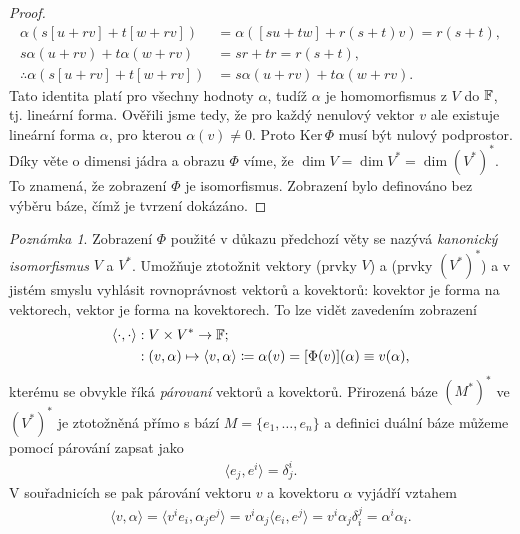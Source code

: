\documentclass[a4paper,11pt]{report}
\theoremstyle{theorem}
\theoremstyle{remark}
\newtheorem*{remark}{Poznámka}
\theoremstyle{definition}
\newcommand{\Ker}{{\mathrm{Ker}\,}}
\begin{document}
\begin{proof}
				\begin{align*}
					\alpha(s[u+rv] + t[w+rv]) &= \alpha([su + tw] + r(s+t)v) = r(s+t),
				\\
					s\alpha(u+rv) + t\alpha(w+rv) &= sr+tr = r(s+t),
				\\
					\therefore \alpha(s[u+rv] + t[w+rv]) &= s\alpha(u+rv) + t\alpha(w+rv).
				\end{align*}
				Tato identita platí pro všechny hodnoty $\alpha$, tudíž $\alpha$ je homomorfismus z $V$ do ${\mathbb F}$, tj. lineární forma. Ověřili jsme tedy, že pro každý nenulový vektor $v$ ale existuje lineární forma $\alpha$, pro kterou $\alpha(v) \not= 0$. Proto $\Ker \Phi$ musí být nulový podprostor.
			\\
				Díky věte o dimensi jádra a obrazu $\Phi$ víme, že $\dim V = \dim V^* = \dim (V^*)^*$. To znamená, že zobrazení $\Phi$ je isomorfismus. Zobrazení bylo definováno bez výběru báze, čímž je tvrzení dokázáno.
			\end{proof}
			
			\begin{remark}
				Zobrazení $\Phi$ použité v důkazu předchozí věty se nazývá \textit{kanonický isomorfismus} $V$ a $V^*$. Umožňuje ztotožnit vektory (prvky $V$) a  (prvky $(V^*)^*$) a v jistém smyslu vyhlásit rovnoprávnost vektorů a kovektorů: kovektor je forma na vektorech, vektor je forma na kovektorech. To lze vidět zavedením zobrazení
				\begin{align*}
					\langle \cdot , \cdot \rangle &: V \times V^* \to {\mathbb F};
				\\
					&: (v,\alpha) \mapsto \langle v,\alpha \rangle \coloneqq \alpha(v) = [\Phi(v)](\alpha) \equiv v(\alpha),
				\end{align*}
				kterému se obvykle říká \textit{párovaní} vektorů a kovektorů. Přirozená báze $(M^*)^*$ ve $(V^*)^*$ je ztotožněná přímo s bází $M = \{e_1, \dots, e_n\}$ a definici duální báze můžeme pomocí párování zapsat jako
				\begin{align*}
					\langle e_j, e^i \rangle = \delta^i_j.
				\end{align*}
				V souřadnicích se pak párování vektoru $v$ a kovektoru $\alpha$ vyjádří vztahem
				\begin{align*}
					\langle v,\alpha \rangle = \langle v^i e_i, \alpha_j e^j \rangle = v^i \alpha_j \langle e_i, e^j \rangle = v^i \alpha_j \delta^j_i = \alpha^i \alpha_i.
				\end{align*}
			\end{remark}
			
\end{document}
